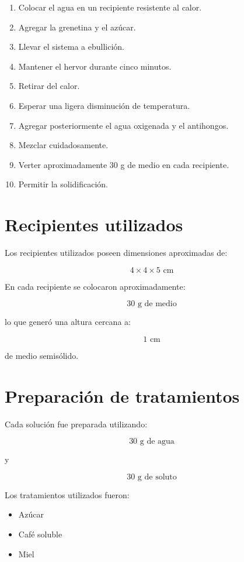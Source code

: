 \begin{enumerate}
\item Colocar el agua en un recipiente resistente al calor.
\item Agregar la grenetina y el azúcar.
\item Llevar el sistema a ebullición.
\item Mantener el hervor durante cinco minutos.
\item Retirar del calor.
\item Esperar una ligera disminución de temperatura.
\item Agregar posteriormente el agua oxigenada y el antihongos.
\item Mezclar cuidadosamente.
\item Verter aproximadamente 30 g de medio en cada recipiente.
\item Permitir la solidificación.
\end{enumerate}

\section{Recipientes utilizados}

Los recipientes utilizados poseen dimensiones aproximadas de:

\[
4 \times 4 \times 5 \text{ cm}
\]

En cada recipiente se colocaron aproximadamente:

\[
30 \text{ g de medio}
\]

lo que generó una altura cercana a:

\[
1 \text{ cm}
\]

de medio semisólido.

\section{Preparación de tratamientos}

Cada solución fue preparada utilizando:

\[
30 \text{ g de agua}
\]

y

\[
30 \text{ g de soluto}
\]

Los tratamientos utilizados fueron:

\begin{itemize}
\item Azúcar
\item Café soluble
\item Miel
\end{itemize}

